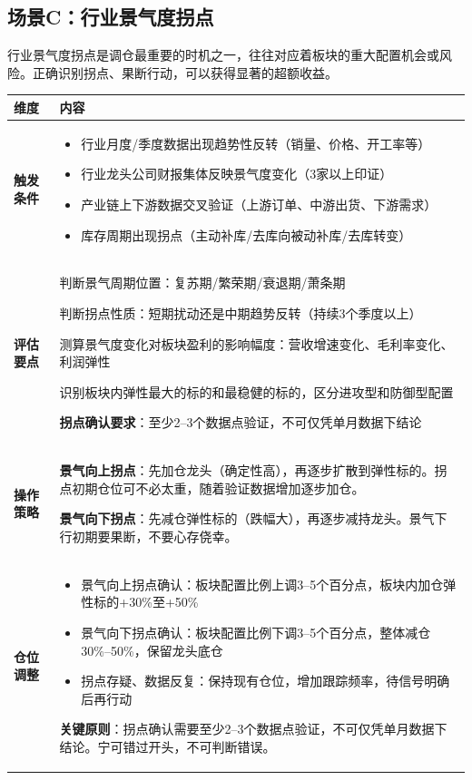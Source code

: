 \subsection{场景C：行业景气度拐点}

行业景气度拐点是调仓最重要的时机之一，往往对应着板块的重大配置机会或风险。正确识别拐点、果断行动，可以获得显著的超额收益。

\begin{exhibitbox}[表9-19：行业景气度拐点调仓指南]
\scriptsize
\setlength{\tabcolsep}{3pt}
\renewcommand{\arraystretch}{1.12}
\begin{tabularx}{\textwidth}{l X}
\toprule
\textbf{维度} & \textbf{内容} \\
\midrule
\textbf{触发条件} & 
\begin{itemize}[leftmargin=1.2em]
\item 行业月度/季度数据出现趋势性反转（销量、价格、开工率等）
\item 行业龙头公司财报集体反映景气度变化（3家以上印证）
\item 产业链上下游数据交叉验证（上游订单、中游出货、下游需求）
\item 库存周期出现拐点（主动补库/去库向被动补库/去库转变）
\end{itemize}
\\
\midrule
\textbf{评估要点} & 
判断景气周期位置：复苏期/繁荣期/衰退期/萧条期

判断拐点性质：短期扰动还是中期趋势反转（持续3个季度以上）

测算景气度变化对板块盈利的影响幅度：营收增速变化、毛利率变化、利润弹性

识别板块内弹性最大的标的和最稳健的标的，区分进攻型和防御型配置

\textbf{拐点确认要求}：至少2--3个数据点验证，不可仅凭单月数据下结论
\\
\midrule
\textbf{操作策略} & 
\textbf{景气向上拐点}：先加仓龙头（确定性高），再逐步扩散到弹性标的。拐点初期仓位可不必太重，随着验证数据增加逐步加仓。

\textbf{景气向下拐点}：先减仓弹性标的（跌幅大），再逐步减持龙头。景气下行初期要果断，不要心存侥幸。
\\
\midrule
\textbf{仓位调整} & 
\begin{itemize}[leftmargin=1.2em]
\item 景气向上拐点确认：板块配置比例上调3--5个百分点，板块内加仓弹性标的+30\%至+50\%
\item 景气向下拐点确认：板块配置比例下调3--5个百分点，整体减仓30\%--50\%，保留龙头底仓
\item 拐点存疑、数据反复：保持现有仓位，增加跟踪频率，待信号明确后再行动
\end{itemize}
\vspace{0.3em}
\textbf{关键原则}：拐点确认需要至少2--3个数据点验证，不可仅凭单月数据下结论。宁可错过开头，不可判断错误。
\\
\bottomrule
\end{tabularx}
\vspace{0.2cm}


\end{exhibitbox}
